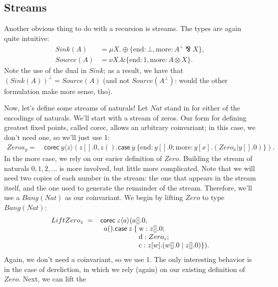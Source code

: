 \documentclass[orivec,envcountsame]{llncs}
\newcommand{\with}{\mathbin\binampersand}
\newcommand{\parr}{\mathbin\bindnasrepma}
\newcommand{\cpdual}[1]{#1^\perp}
\newcommand{\mkwd}[1]{\mathsf{#1}}
\newcommand{\tkwd}[1]{\textsf{#1}}
\newcommand{\corec}[5]{\mkwd{corec}\:#1 \langle #2 \rangle (#4,#5)}
\newcommand{\clabel}[1]{\mathrm{#1}}
\renewcommand{\case}[2]{\mkwd{case}\:#1\:\{#2\}}
\begin{document}
\subsection{Streams}

Another obvious thing to do with a recursion is streams.  The types are again quite intuitive:
{\small\begin{align*}
  Sink(A) &= \mu X. \oplus \{ \clabel{end}: \bot, \clabel{more}: \cpdual{A} \parr X \}, \\
  Source(A) &= \nu X. \with \{ \clabel{end}: 1, \clabel{more}: A \otimes X \}.
\end{align*}}
Note the use of the dual in $Sink$; as a result, we have that $\cpdual{(Sink(A))} = Source(A)$ (and
not $Source(\cpdual{A})$: would the other formulation make more sense, tho).

Now, let's define some streams of naturals!  Let $Nat$ stand in for either of the encodings of
naturals.  We'll start with a stream of zeros.  Our form for defining greatest fixed points, called
\tkwd{corec}, allows an arbitrary coinvariant; in this case, we don't need one, so we'll just use 1:
%
{\small\begin{align*}
  Zeros_y =\ &\corec{y}{z}{1}{z[].0}{z().\case{y}{\clabel{end}: y[].0; \clabel{more}: y[x].(Zero_x | y[].0)}}.
\end{align*}}
%
In the \textrm{more} case, we rely on our earier definition of $Zero$.  Building the stream of
naturals $0,1,2,\dots$ is more involved, but little more complicated. Note that we will need two
copies of each number in the stream: the one that appears in the stream itself, and the one used to
generate the remainder of the stream.  Therefore, we'll use a $Bang(Nat)$ as our coinvariant.  We
begin by lifting $Zero$ to type $Bang(Nat)$:
%
{\small\[\begin{array}{r@{\hspace{2mm}}c@{\hspace{2mm}}l@{\hspace{0mm}}l@{\:}l}
  LiftZero_z & = & \multicolumn{3}{l}{\mkwd{corec} \: z \langle a \rangle (a[].0,} \\
  & & \quad & a().\mkwd{case}\: z \: \{ &\clabel{w}: z[].0; \\
  & & & & \clabel{d}: Zero_z; \\
  & & & & \clabel{c}: z[w].(w[].0 \mid z[].0) \}).
\end{array}\]}
%
Again, we don't need a coinvariant, so we use 1.  The only interesting behavior is in the case of
dereliction, in which we rely (again) on our existing definition of $Zero$.  Next, we can lift the
\end{document}
